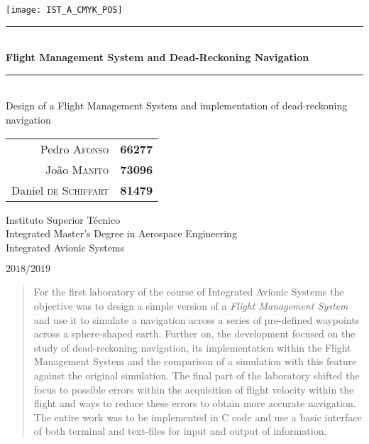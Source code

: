 \documentclass{article}
\begin{document}
\begin{titlepage}

\texttt{[image: IST\_A\_CMYK\_POS]}
	
\begin{center}
	\vspace{40mm} %
	\rule{\linewidth}{0.5pt} \\
    \vspace{2mm}
	\Huge \textbf{Flight Management System and Dead-Reckoning Navigation} \\
	\rule{\linewidth}{2pt} \\
	\vspace{8mm} %
	\Large Design of a Flight Management System and implementation of dead-reckoning navigation
	
	\vspace{\fill} %
	
	\normalsize
	\begin{tabular}{r l}
		Pedro \textsc{Afonso} & \textbf{66277} \\
		João \textsc{Manito} & \textbf{73096} \\
		Daniel \textsc{de Schiffart} & \textbf{81479}
	\end{tabular}
	
	\vspace{10mm} %
	\Large Instituto Superior Técnico \\
	Integrated Master's Degree in Aerospace Engineering \\
	\vspace{1mm}
	\large Integrated Avionic Systems
	
	\vspace{10mm} %
	\Large $2018/2019$
\end{center}

\end{titlepage}

{\hypersetup{linkcolor = black} \tableofcontents}

\begin{abstract}
	For the first laboratory of the course of Integrated Avionic Systems the objective was to design a simple version of a \emph{Flight Management System} and use it to simulate a navigation across a series of pre-defined waypoints across a sphere-shaped earth. Further on, the development focused on the study of dead-reckoning navigation, its implementation within the Flight Management System and the comparison of a simulation with this feature against the original simulation. The final part of the laboratory shifted the focus to possible errors within the acquisition of flight velocity within the flight and ways to reduce these errors to obtain more accurate navigation. The entire work was to be implemented in C code and use a basic interface of both terminal and text-files for input and output of information.
\end{abstract}
\end{document}
